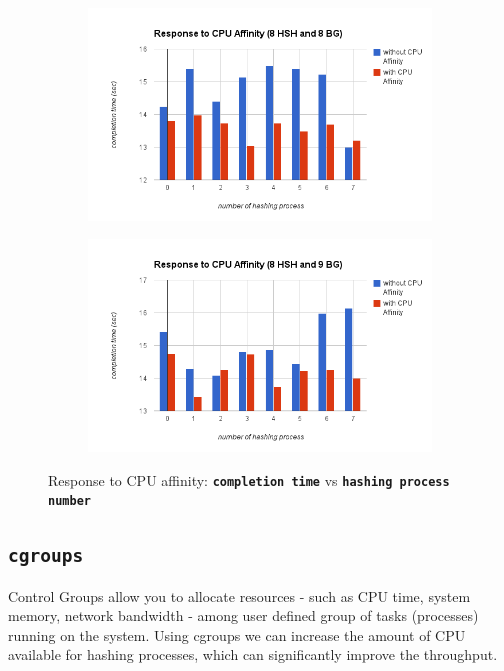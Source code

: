\documentclass[10pt] {article}
\begin{document}
\begin{figure}[ht!]
\centering
\begin{subfigure}{.5\textwidth}
  \centering
  \includegraphics[width=\linewidth]{./cpu_agg_8_8.png}
  \caption{}
  \label{fig:sub1}
\end{subfigure}%
\begin{subfigure}{.5\textwidth}
  \centering
  \includegraphics[width=\linewidth]{cpu_aff_8_9.png}
  \caption{}
  \label{fig:sub2}
\end{subfigure}
\caption{Response to CPU affinity: \textbf{\texttt{completion time}}  vs  \textbf{\texttt{hashing process number}}}
\label{fig:cpu_affinity}
\end{figure}

\subsection{\texttt{cgroups} }
Control Groups allow you to allocate resources - such as CPU time, system memory, network bandwidth - among user defined group of tasks (processes) running on the system. Using cgroups we can increase the amount of CPU available for hashing processes, which can significantly improve the throughput. \\
\end{document}
